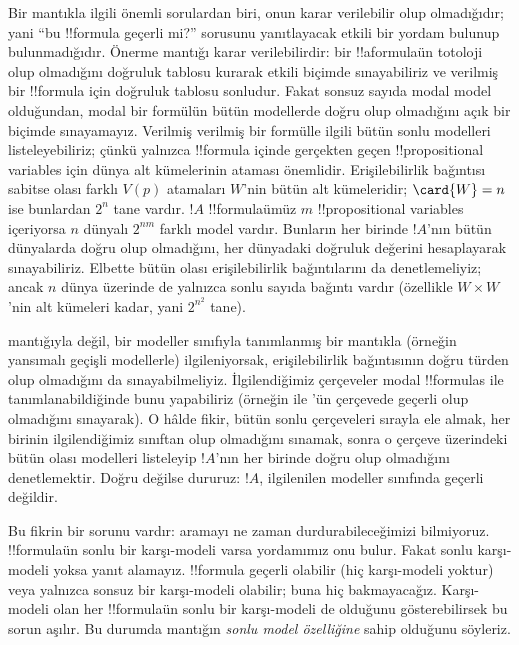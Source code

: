 



Bir mantıkla ilgili önemli sorulardan biri, onun karar verilebilir olup
olmadığıdır; yani ``bu !!{formula} geçerli mi?'' sorusunu yanıtlayacak etkili
bir yordam bulunup bulunmadığıdır. Önerme mantığı karar verilebilirdir: bir
!!a{formula}{}ün totoloji olup olmadığını doğruluk tablosu kurarak etkili
biçimde sınayabiliriz ve verilmiş bir !!{formula} için doğruluk tablosu
sonludur. Fakat sonsuz sayıda modal model olduğundan, modal bir formülün
bütün modellerde doğru olup olmadığını açık bir biçimde sınayamayız. Verilmiş
  verilmiş bir formülle ilgili bütün sonlu modelleri listeleyebiliriz; çünkü yalnızca
!!{formula} içinde gerçekten geçen !!{propositional variable}s için dünya
alt kümelerinin ataması önemlidir. Erişilebilirlik bağıntısı sabitse olası
farklı $V(p)$ atamaları $W$'nin bütün alt kümeleridir; $\card{W}=n$ ise
bunlardan $2^n$ tane vardır. $!A$ !!{formula}{}ümüz $m$ !!{propositional
variable}s içeriyorsa $n$ dünyalı $2^{nm}$ farklı model vardır. Bunların her
  birinde $!A$'nın bütün dünyalarda doğru olup olmadığını, her dünyadaki
  doğruluk değerini hesaplayarak sınayabiliriz. Elbette bütün olası
erişilebilirlik bağıntılarını da denetlemeliyiz; ancak $n$ dünya üzerinde de
yalnızca sonlu sayıda bağıntı vardır (özellikle $W\times W$'nin alt kümeleri
kadar, yani $2^{n^2}$ tane).

   mantığıyla değil, bir modeller sınıfıyla tanımlanmış bir mantıkla
(örneğin yansımalı geçişli modellerle) ilgileniyorsak, erişilebilirlik
bağıntısının doğru türden olup olmadığını da sınayabilmeliyiz. İlgilendiğimiz
çerçeveler modal !!{formula}s ile tanımlanabildiğinde bunu yapabiliriz
(örneğin  ile 'ün çerçevede geçerli olup olmadığını sınayarak).
O hâlde fikir, bütün sonlu çerçeveleri sırayla ele almak, her birinin
ilgilendiğimiz sınıftan olup olmadığını sınamak, sonra o çerçeve üzerindeki
bütün olası modelleri listeleyip $!A$'nın her birinde doğru olup olmadığını
denetlemektir. Doğru değilse dururuz: $!A$, ilgilenilen modeller sınıfında
geçerli değildir.

Bu fikrin bir sorunu vardır: aramayı ne zaman durdurabileceğimizi bilmiyoruz.
!!{formula}{}ün sonlu bir karşı-modeli varsa yordamımız onu bulur. Fakat sonlu
karşı-modeli yoksa yanıt alamayız. !!{formula} geçerli olabilir (hiç
karşı-modeli yoktur) veya yalnızca sonsuz bir karşı-modeli olabilir; buna
hiç bakmayacağız. Karşı-modeli olan her !!{formula}{}ün sonlu bir karşı-modeli
de olduğunu gösterebilirsek bu sorun aşılır. Bu durumda mantığın
\emph{sonlu model özelliğine} sahip olduğunu söyleriz.

